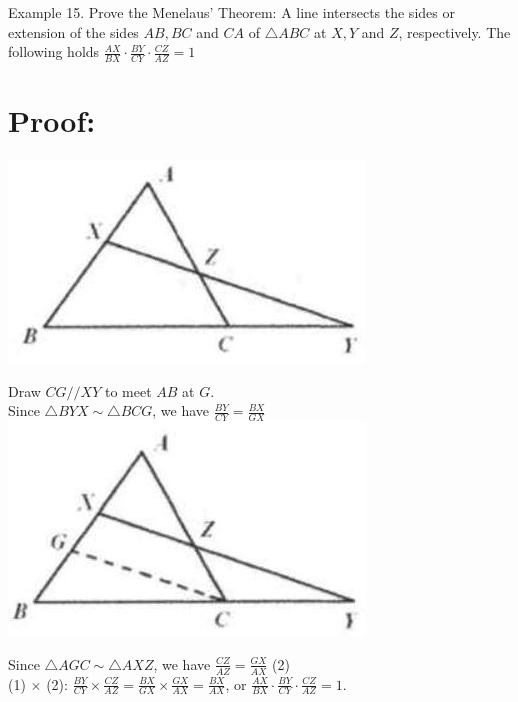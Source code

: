 \documentclass[10pt]{article}
\begin{document}
Example 15. Prove the Menelaus' Theorem: A line intersects the sides or extension of the sides \(A B, B C\) and \(C A\) of \(\triangle A B C\) at \(X, Y\) and \(Z\), respectively. The following holds \(\frac{A X}{B X} \cdot \frac{B Y}{C Y} \cdot \frac{C Z}{A Z}=1\)

\section*{Proof:}
\begin{center}
\includegraphics[max width=\textwidth]{2025_04_17_97bc1f7e44d93c271a88g-117(1)}
\end{center}

Draw \(C G / / X Y\) to meet \(A B\) at \(G\).\\
Since \(\triangle B Y X \sim \triangle B C G\), we have \(\frac{B Y}{C Y}=\frac{B X}{G X}\)\\
\includegraphics[max width=\textwidth, center]{2025_04_17_97bc1f7e44d93c271a88g-117(2)}

Since \(\triangle A G C \sim \triangle A X Z\), we have \(\frac{C Z}{A Z}=\frac{G X}{A X}\) (2)\\
(1) \(\times\) (2): \(\frac{B Y}{C Y} \times \frac{C Z}{A Z}=\frac{B X}{G X} \times \frac{G X}{A X}=\frac{B X}{A X}\), or \(\frac{A X}{B X} \cdot \frac{B Y}{C Y} \cdot \frac{C Z}{A Z}=1\).
\end{document}
